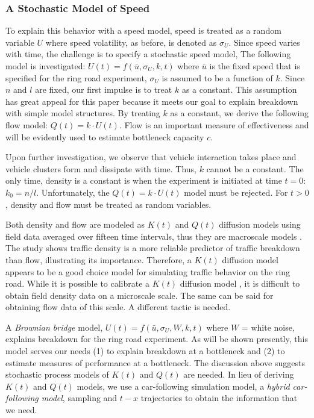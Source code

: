 \documentclass[Proceedings]{ascelike}
\begin{document}
\subsubsection{A Stochastic Model of Speed}

To explain this behavior with a speed model, speed is treated as a random variable $U$ where speed volatility, as before, is denoted as $\sigma_U$.  Since speed varies with time, the challenge is  to specify a stochastic speed model, The following model is investigated: $U(t) = f(\bar{u},\sigma_U,k,t)$ where $\bar{u}$ is the fixed speed that is specified for the ring road experiment, $\sigma_U$ is assumed to be a function of $k$. Since $n$ and $l$ are fixed, our first impulse is to treat $k$ as a constant. This assumption has great appeal for this paper because it meets our goal to explain breakdown with simple model structures. By treating  $k$ as a constant,  we derive the following flow model: $Q(t) = k \cdot U(t)$. Flow is an important measure of effectiveness and will be evidently used to estimate bottleneck capacity $c$.

Upon further investigation, we observe that vehicle interaction  takes place and vehicle clusters form and dissipate with time. Thus, $k$ cannot be a constant. The only time, density is a constant is when the experiment is initiated at time $t = 0$: $k_0 = n/l$. Unfortunately, the $Q(t) = k \cdot U(t)$ model must be rejected. For $t > 0$, density and flow must be treated as random variables. 

Both density and flow are modeled as $K(t)$ and $Q(t)$ diffusion models using field data averaged over fifteen time intervals, thus they are macroscale models  \cite{pjo2017}. The study shows traffic density is a more reliable predictor of traffic breakdown than flow, illustrating its  importance. Therefore,  a $K(t)$ diffusion model appears to be a good choice model for simulating traffic behavior on the ring road.  While it is possible  to calibrate a $K(t)$ diffusion model \cite{KISH2000271}, it is difficult to obtain field density data on a microscale scale. The same can be said for obtaining flow data of this scale. A different tactic is needed.

A \emph{Brownian bridge} model, $U(t) = f(\bar{u},\sigma_U,W,k,t)$ where $W$ = white noise, explains breakdown for the ring road experiment. As will be shown presently, this model  serves our needs (1) to explain breakdown at a bottleneck and (2) to estimate measures of performance at a bottleneck. The discussion above suggests stochastic process models of $K(t)$ and $Q(t)$ are needed. In lieu of deriving $K(t)$ and $Q(t)$ models, we use a car-following simulation model, a \emph{hybrid car-following model}, sampling and $t-x$ trajectories to obtain the information that we need. 
\end{document}

